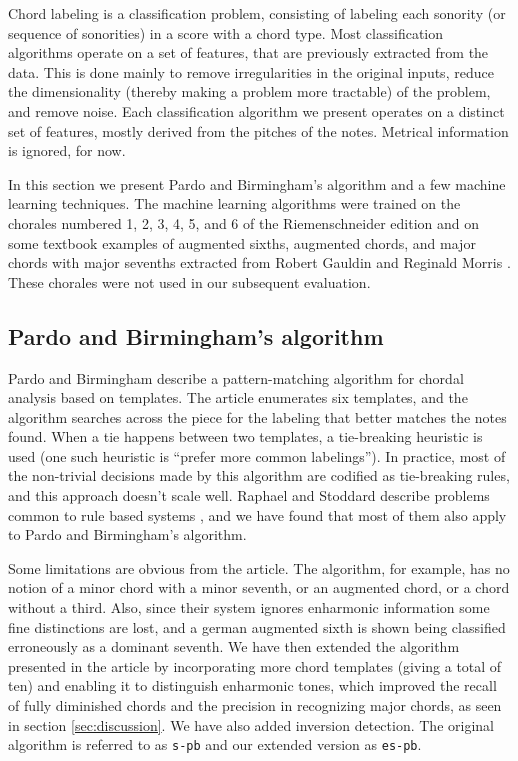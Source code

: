 \documentclass{article}
\begin{document}
Chord labeling is a classification problem, consisting of labeling
each sonority (or sequence of sonorities) in a score with a chord
type. Most classification algorithms operate on a set of features,
that are previously extracted from the data. This is done mainly to
remove irregularities in the original inputs, reduce the
dimensionality (thereby making a problem more tractable) of the
problem, and remove noise. Each classification algorithm we present
operates on a distinct set of features, mostly derived from the
pitches of the notes. Metrical information is ignored, for now.

In this section we present Pardo and Birmingham's algorithm and a few
machine learning techniques. The machine learning algorithms were
trained on the chorales numbered 1, 2, 3, 4, 5, and 6 of the
Riemenschneider edition and on some textbook examples of augmented
sixths, augmented chords, and major chords with major sevenths
extracted from Robert Gauldin \cite{gauldin05:harmonic} and Reginald
Morris \cite{morris33:figured}. These chorales were not used in our
subsequent evaluation.

\subsection{Pardo and Birmingham's algorithm}
\label{sec:pardo}


Pardo and Birmingham \cite{barthelemy.ea01:figured} describe a
pattern-matching algorithm for chordal analysis based on templates.
The article enumerates six templates, and the algorithm searches
across the piece for the labeling that better matches the notes found.
When a tie happens between two templates, a tie-breaking heuristic is
used (one such heuristic is ``prefer more common labelings''). In
practice, most of the non-trivial decisions made by this algorithm are
codified as tie-breaking rules, and this approach doesn't scale
well. Raphael and Stoddard describe problems common to rule based
systems \cite{raphael.ea03:harmonic}, and we have found that most of
them also apply to Pardo and Birmingham's algorithm.

Some limitations are obvious from the article. The algorithm, for
example, has no notion of a minor chord with a minor seventh, or an
augmented chord, or a chord without a third. Also, since their system
ignores enharmonic information some fine distinctions are lost, and a
german augmented sixth is shown being classified erroneously as a
dominant seventh. We have then extended the algorithm presented in the
article by incorporating more chord templates (giving a total of ten)
and enabling it to distinguish enharmonic tones, which improved the
recall of fully diminished chords and the precision in recognizing
major chords, as seen in section \ref{sec:discussion}. We have also
added inversion detection. The original algorithm is referred to as
\texttt{s-pb} and our extended version as \texttt{es-pb}.
\end{document}
